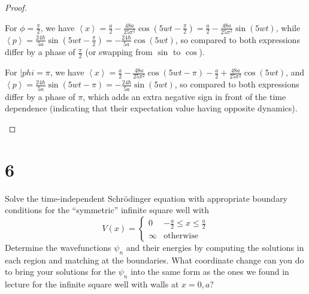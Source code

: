 \documentclass{article}
\begin{document}
\begin{proof}
\begin{itemize}
        For $\phi=\frac{\pi}{2}$, we have $\left<x\right>=\frac{a}{2}-\frac{48a}{25\pi^2}\cos(5wt-\frac{\pi}{2})=\frac{a}{2}-\frac{48a}{25\pi^2}\sin(5wt)$, while $\left<p\right> = \frac{24\hbar}{5a}\sin(5wt-\frac{\pi}{2})=-\frac{24\hbar}{5a}\cos(5wt)$, so compared to  both expressions differ by a phase of $\frac{\pi}{2}$ (or swapping from $\sin$ to $\cos$).

        For $|phi=\pi$, we have $\left<x\right>=\frac{a}{2}-\frac{48a}{25\pi^2}\cos(5wt-\pi) - \frac{a}{2}+\frac{48a}{25\pi^2}\cos(5wt)$, and $\left<p\right>=\frac{24\hbar}{5a}\sin(5wt-\pi)=-\frac{24\hbar}{5a}\sin(5wt)$, so compared to  both expressions differ by a phase of $\pi$, which adds an extra negative sign in front of the time dependence (indicating that their expectation value having opposite dynamics).
    \end{itemize}
\end{proof}

\newpage

\section*{6}
\begin{ques}\label{q6}
Solve the time-independent Schrödinger equation with appropriate boundary conditions
for the “symmetric” infinite square well with
\[
V(x) =
\begin{cases}
0 & -\frac{a}{2} \le x \le \frac{a}{2} \\
\infty & \text{otherwise}
\end{cases}
\]
Determine the wavefunctions $\psi_n$ and their energies by computing the solutions in each
region and matching at the boundaries. What coordinate change can you do to bring your
solutions for the $\psi_n$ into the same form as the ones we found in lecture for the infinite
square well with walls at $x = 0, a$?
\end{ques}
\end{document}
